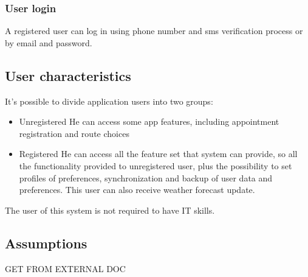 \subsubsection{User login}

A registered user can log in using phone number and sms verification process or by email and password.



\subsection{User characteristics}

It’s possible to divide application users into two groups:

\begin{itemize}
	\item Unregistered
	\subitem He can access some app features, including appointment registration and route choices
	\item Registered
	\subitem He can access all the feature set that system can provide, so all the functionality provided to unregistered user, plus the possibility to set profiles of preferences, synchronization and backup of user data and preferences. This user can also receive weather forecast update.
\end{itemize}

The user of this system is not required to have IT skills.

\subsection{Assumptions}

{GET FROM EXTERNAL DOC}
